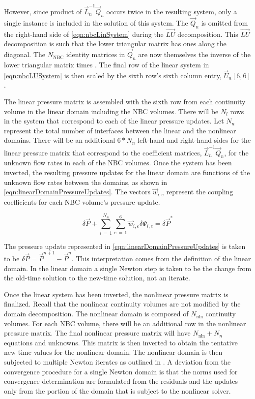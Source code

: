 However, since product of $\vec{L}_{n}^{-1}\vec{Q}_{n}$ occurs twice in the resulting system, only a single instance is included in the solution of this system.
The $\vec{Q}_{n}$ is omitted from the right-hand side of \eqref{eqn:nbcLinSystem} during the $\vec{LU}$ decomposition.
This $\vec{LU}$ decomposition is such that the lower triangular matrix has ones along the diagonal.
The $N_{\text{NBC}}$ identity matrices in $\vec{Q}_{n}$ are now themselves the inverse of the lower triangular matrix times \dt{}.
The final row of the linear system in \eqref{eqn:nbcLUSystem} is then scaled by the sixth row's sixth column entry, $\vec{U}_{n}[6,6]$.

The linear pressure matrix is assembled with the sixth row from each continuity volume in the linear domain including the NBC volumes.
There will be $N_{l}$ rows in the system that correspond to each of the linear pressure updates.
Let $N_{n}$ represent the total number of interfaces between the linear and the nonlinear domains.
There will be an additional $6 * N_{n}$ left-hand and right-hand sides for the linear pressure matrix that correspond to the coefficient matrices, $\vec{L}^{-1}_{n}\vec{Q}_{n}$, for the unknown flow rates in each of the NBC volumes.
Once the system has been inverted, the resulting pressure updates for the linear domain are functions of the unknown flow rates between the domains, as shown in \eqref{eqn:linearDomainPressureUpdates}.
The vectors $\vec{w}_{i, e}$ represent the coupling coefficients for each NBC volume's pressure update.

\begin{equation}
\label{eqn:linearDomainPressureUpdates}
\delta \vec{P} + \sum_{i\,=\,1}^{N_{n}} \sum_{e\,=\,1}^{6} \vec{w}_{i, e} \delta \Psi_{i, e} = \delta \vec{P}^{*} 
\end{equation}


The pressure update represented in \eqref{eqn:linearDomainPressureUpdates} is taken to be $\delta \vec{P} = \vec{P}^{n+1} - \vec{P}^{n}$.
This interpretation comes from the definition of the linear domain.
In the linear domain a single Newton step is taken to be the change from the old-time solution to the new-time solution, not an iterate.

Once the linear system has been inverted, the nonlinear pressure matrix is finalized.
Recall that the nonlinear continuity volumes are not modified by the domain decomposition.
The nonlinear domain is composed of $N_{\text{nln}}$ continuity volumes.
For each NBC volume, there will be an additional row in the nonlinear pressure matrix.
The final nonlinear pressure matrix will have $N_{\text{nln}} + N_{n}$ equations and unknowns.
This matrix is then inverted to obtain the tentative new-time values for the nonlinear domain.
The nonlinear domain is then subjected to multiple Newton iterates as outlined in .
A deviation from the convergence procedure for a single Newton domain is that the norms used for convergence determination are formulated from the residuals and the updates only from the portion of the domain that is subject to the nonlinear solver.

